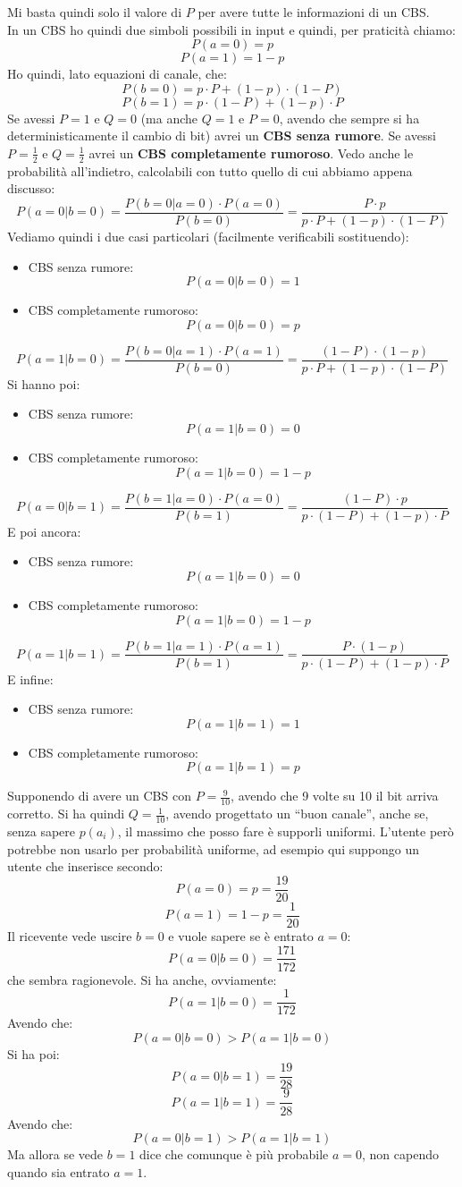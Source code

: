 \documentclass[a4paper,12pt, oneside]{book}
\begin{document}
Mi basta quindi solo il valore di $P$ per avere tutte le informazioni di un
CBS. \\
In un CBS ho quindi due simboli possibili in input e quindi, per praticità
chiamo: 
\[P(a=0)=p\]
\[P(a=1)=1-p\]
Ho quindi, lato equazioni di canale, che:
\[P(b=0)=p\cdot P+(1-p)\cdot (1-P)\]
\[P(b=1)=p\cdot (1-P)+ (1-p)\cdot P\]
Se avessi $P=1$ e $Q=0$ (ma anche $Q=1$ e $P=0$, avendo che sempre si ha
deterministicamente il cambio di bit) avrei un \textbf{CBS senza
  rumore}. Se avessi $P=\frac{1}{2}$ e $Q=\frac{1}{2}$ avrei un \textbf{CBS
  completamente rumoroso}.
Vedo anche le probabilità all'indietro, calcolabili con tutto quello di cui
abbiamo appena discusso:
\[P(a=0|b=0)=\frac{P(b=0|a=0)\cdot P(a=0)}{P(b=0)}=\frac{P\cdot p}{p\cdot
    P+(1-p)\cdot (1-P)}\]
Vediamo quindi i due casi particolari (facilmente verificabili sostituendo):
\begin{itemize}
  \item CBS senza rumore:
  \[P(a=0|b=0)=1\]
  \item CBS completamente rumoroso:
  \[P(a=0|b=0)=p\]
\end{itemize}
\[P(a=1|b=0)=\frac{P(b=0|a=1)\cdot P(a=1)}{P(b=0)}=\frac{(1-P)\cdot
    (1-p)}{p\cdot P+(1-p)\cdot (1-P)}\]
Si hanno poi:
\begin{itemize}
  \item CBS senza rumore:
  \[P(a=1|b=0)=0\]
  \item CBS completamente rumoroso:
  \[P(a=1|b=0)=1-p\]
\end{itemize}
\[P(a=0|b=1)=\frac{P(b=1|a=0)\cdot P(a=0)}{P(b=1)}=\frac{(1-P)\cdot p}{p\cdot
    (1-P)+ (1-p)\cdot P}\]  
E poi ancora:
\begin{itemize}
  \item CBS senza rumore:
  \[P(a=1|b=0)=0\]
  \item CBS completamente rumoroso:
  \[P(a=1|b=0)=1-p\]
\end{itemize}
\[P(a=1|b=1)=\frac{P(b=1|a=1)\cdot P(a=1)}{P(b=1)}=\frac{P\cdot
    (1-p)}{p\cdot (1-P)+ (1-p)\cdot P}\]
E infine:
\begin{itemize}
  \item CBS senza rumore:
  \[P(a=1|b=1)=1\]
  \item CBS completamente rumoroso:
  \[P(a=1|b=1)=p\]
\end{itemize}
\begin{esempio}
  Supponendo di avere un CBS con $P=\frac{9}{10}$, avendo che 9 volte su 10 il
  bit 
  arriva corretto. Si ha quindi $Q=\frac{1}{10}$, avendo progettato un ``buon
  canale'', anche se, senza sapere $p(a_i)$, il massimo che posso fare è
  supporli 
  uniformi. L'utente però potrebbe non usarlo per probabilità uniforme, ad
  esempio 
  qui suppongo un utente che inserisce secondo:
  \[P(a=0)=p=\frac{19}{20}\]
  \[P(a=1)=1-p=\frac{1}{20}\]
  Il ricevente vede uscire $b=0$ e vuole sapere se è entrato $a=0$:
  \[P(a=0|b=0)=\frac{171}{172}\]
  che sembra ragionevole. Si ha anche, ovviamente:
  \[P(a=1|b=0)=\frac{1}{172}\]
  Avendo che:
  \[P(a=0|b=0)>P(a=1|b=0)\]
  Si ha poi:
  \[P(a=0|b=1)=\frac{19}{28}\]
  \[P(a=1|b=1)=\frac{9}{28}\]
  Avendo che:
  \[P(a=0|b=1)>P(a=1|b=1)\]
  Ma allora se vede $b=1$ dice che comunque è più probabile $a=0$, non capendo
  quando sia entrato $a=1$.
\end{esempio}
\end{document}
